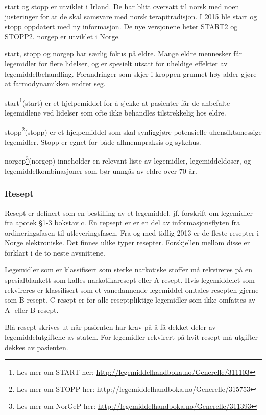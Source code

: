 \acrshort{start} og \acrshort{stopp} er utviklet i Irland. De har blitt oversatt til norsk med noen justeringer for at de skal samsvare med norsk terapitradisjon. I 2015 ble \acrshort{start} og \acrshort{stopp} oppdatert med ny informasjon. De nye versjonene heter START2 og STOPP2. \acrshort{norgep} er utviklet i Norge. 

\acrshort{start}, \acrshort{stopp} og \acrshort{norgep} har særlig fokus på eldre. Mange eldre mennesker får legemidler for flere lidelser, og er spesielt utsatt for uheldige effekter av legemiddelbehandling. Forandringer som skjer i kroppen grunnet høy alder gjøre at farmodynamikken endrer seg.

\acrshort{start}\footnote{Les mer om START her: \url{http://legemiddelhandboka.no/Generelle/311103}}(\acrlong{start}) er et hjelpemiddel for å sjekke at pasienter får de anbefalte legemidlene ved lidelser som ofte ikke behandles tilstrekkelig hos eldre.
 
\acrshort{stopp}\footnote{Les mer om STOPP her: \url{http://legemiddelhandboka.no/Generelle/315753}}(\acrlong{stopp}) er et hjelpemiddel som skal synliggjøre potensielle uhensiktsmessige legemidler. Stopp er egnet for både allmennpraksis og sykehus.

\acrshort{norgep}\footnote{Les mer om NorGeP her: \url{http://legemiddelhandboka.no/Generelle/311393}}(\acrlong{norgep}) inneholder en relevant liste av legemidler, legemiddeldoser, og legemiddelkombinasjoner som bør unngås av eldre over 70 år. 

\subsubsection{Resept}
Resept er definert som en bestilling av et legemiddel, jf. forskrift om legemidler fra apotek §1-3 bokstav c. En repsept er er en del av informasjonsflyten fra ordineringsfasen til utleveringsfasen. Fra og med tidlig 2013 er de fleste resepter i Norge elektroniske. Det finnes ulike typer resepter. Forskjellen mellom disse er forklart i de to neste avsnittene.

Legemidler som er klassifisert som sterke narkotiske stoffer må rekvireres på en spesialblankett som kalles narkotikaresept eller A-resept. Hvis legemiddelet som rekvireres er klassifisert som et vanedannende legemiddel omtales resepten gjerne som B-resept. C-resept er for alle reseptpliktige legemidler som ikke omfattes av A- eller B-resept.

Blå resept skrives ut når pasienten har krav på å få dekket deler av legemiddelutgiftene av staten. For legemidler rekvirert på hvit resept må utgifter dekkes av pasienten. 

